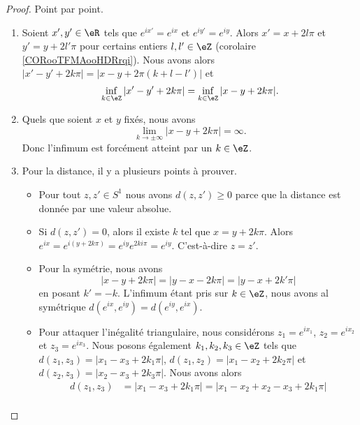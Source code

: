 \begin{proof}
	Point par point.
	\begin{enumerate}
		\item
		      Soient \( x',y'\in \eR\) tels que \(  e^{ix'}= e^{ix}\) et \(  e^{iy'}= e^{iy}\). Alors \( x'=x+2l\pi\) et \( y'=y+2l'\pi\) pour certains entiers \( l,l'\in \eZ\) (corolaire \ref{CORooTFMAooHDRrqi}). Nous avons alors \( | x'-y'+2k\pi |=| x-y+2\pi(k+l-l') |\) et
		      \begin{equation}
			      \inf_{k\in \eZ}| x'-y'+2k\pi |=\inf_{k\in \eZ}| x-y+2k\pi |.
		      \end{equation}
		\item
		      Quels que soient \( x\) et \( y\) fixés, nous avons
		      \begin{equation}
			      \lim_{k\to \pm\infty} | x-y+2k\pi |=\infty.
		      \end{equation}
		      Donc l'infimum est forcément atteint par un \( k\in \eZ\).
		\item
		      Pour la distance, il y a plusieurs points à prouver.
		      \begin{itemize}
			      \item
			            Pour tout \( z,z'\in S^1\) nous avons \( d(z,z')\geq 0\) parce que la distance est donnée par une valeur absolue.
			      \item
			            Si \( d(z,z')=0\), alors il existe \( k\) tel que \( x=y+2k\pi\). Alors \(  e^{ix}= e^{i(y+2k\pi)}= e^{iy} e^{2ki\pi}= e^{iy}\). C'est-à-dire \( z=z'\).
			      \item
			            Pour la symétrie, nous avons
			            \begin{equation}
				            | x-y+2k\pi |=| y-x-2k\pi |=| y-x+2k'\pi |
			            \end{equation}
			            en posant \( k'=-k\). L'infimum étant pris sur \( k\in \eZ\), nous avons al symétrique \( d( e^{ix},  e^{iy})=d( e^{iy}, e^{ix})\).
			      \item
			            Pour attaquer l'inégalité triangulaire, nous considérons \( z_1= e^{ix_1}\), \( z_2= e^{ix_2}\) et \( z_3= e^{ix_3}\). Nous posons également \( k_1,k_2, k_3\in \eZ\) tels que \( d(z_1,z_3)=| x_1-x_3+2k_1\pi | \), \( d(z_1,z_2)=| x_1-x_2+2k_2\pi |\) et \( d(z_2,z_3)=| x_2-x_3+2k_3\pi |\). Nous avons alors
			            \begin{subequations}
				            \begin{align}
					            d(z_1,z_3) & =| x_1-x_3+2k_1\pi |=| x_1-x_2+x_2-x_3+2k_1\pi |                          \\

\end{align}
\end{subequations}
\end{itemize}
\end{enumerate}
\end{proof}
